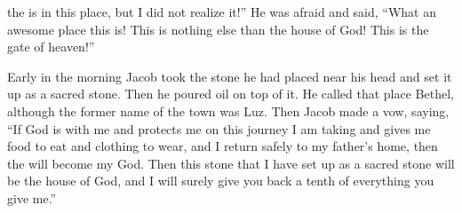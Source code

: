 {the {}
is in this
place,
but I
did not
realize it!”
He was afraid
and said,
“What
an awesome
place
this
is! This
is nothing
else than
the house
of God! This
is the gate
of heaven!”
\par }{\PP {}Early
in the morning
Jacob
took
the stone
he had
placed
near
his head
and set
it up as a sacred stone.
Then he poured
oil
on
top of it.
He called
that
place
Bethel,
although
the former
name
of the town
was Luz.
Then Jacob
made
a vow,
saying,
“If
God
is with me
and protects
me on this
journey
I am
taking
and gives
me food
to eat
and clothing
to wear,
and I return
safely
to
my father’s
home,
then the
{}
will become my God.
Then this
stone
that
I have set
up as a sacred stone
will be
the house
of God,
and I
will surely
give
you back a tenth
of everything you give me.”

}
